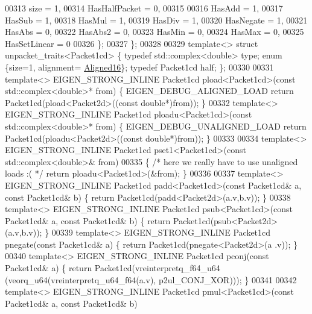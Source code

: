 \begin{DoxyCode}
00313     size = 1,
00314     HasHalfPacket = 0,
00315 
00316     HasAdd    = 1,
00317     HasSub    = 1,
00318     HasMul    = 1,
00319     HasDiv    = 1,
00320     HasNegate = 1,
00321     HasAbs    = 0,
00322     HasAbs2   = 0,
00323     HasMin    = 0,
00324     HasMax    = 0,
00325     HasSetLinear = 0
00326   \};
00327 \};
00328 
00329 \textcolor{keyword}{template}<> \textcolor{keyword}{struct }unpacket\_traits<Packet1cd> \{ \textcolor{keyword}{typedef} std::complex<double> type; \textcolor{keyword}{enum} \{size=1, alignment=
      \hyperlink{group__enums_gga45fe06e29902b7a2773de05ba27b47a1af8e2bf74b04c02199f62c5e3c06dbfcc}{Aligned16}\}; \textcolor{keyword}{typedef} Packet1cd half; \};
00330 
00331 \textcolor{keyword}{template}<> EIGEN\_STRONG\_INLINE Packet1cd pload<Packet1cd>(\textcolor{keyword}{const} std::complex<double>* from) \{ 
      EIGEN\_DEBUG\_ALIGNED\_LOAD \textcolor{keywordflow}{return} Packet1cd(pload<Packet2d>((\textcolor{keyword}{const} \textcolor{keywordtype}{double}*)from)); \}
00332 \textcolor{keyword}{template}<> EIGEN\_STRONG\_INLINE Packet1cd ploadu<Packet1cd>(\textcolor{keyword}{const} std::complex<double>* from) \{ 
      EIGEN\_DEBUG\_UNALIGNED\_LOAD \textcolor{keywordflow}{return} Packet1cd(ploadu<Packet2d>((\textcolor{keyword}{const} \textcolor{keywordtype}{double}*)from)); \}
00333 
00334 \textcolor{keyword}{template}<> EIGEN\_STRONG\_INLINE Packet1cd pset1<Packet1cd>(\textcolor{keyword}{const} std::complex<double>&  from)
00335 \{ \textcolor{comment}{/* here we really have to use unaligned loads :( */} \textcolor{keywordflow}{return} ploadu<Packet1cd>(&from); \}
00336 
00337 \textcolor{keyword}{template}<> EIGEN\_STRONG\_INLINE Packet1cd padd<Packet1cd>(\textcolor{keyword}{const} Packet1cd& a, \textcolor{keyword}{const} Packet1cd& b) \{ \textcolor{keywordflow}{return} 
      Packet1cd(padd<Packet2d>(a.v,b.v)); \}
00338 \textcolor{keyword}{template}<> EIGEN\_STRONG\_INLINE Packet1cd psub<Packet1cd>(\textcolor{keyword}{const} Packet1cd& a, \textcolor{keyword}{const} Packet1cd& b) \{ \textcolor{keywordflow}{return} 
      Packet1cd(psub<Packet2d>(a.v,b.v)); \}
00339 \textcolor{keyword}{template}<> EIGEN\_STRONG\_INLINE Packet1cd pnegate(\textcolor{keyword}{const} Packet1cd& a) \{ \textcolor{keywordflow}{return} Packet1cd(pnegate<Packet2d>(a
      .v)); \}
00340 \textcolor{keyword}{template}<> EIGEN\_STRONG\_INLINE Packet1cd pconj(\textcolor{keyword}{const} Packet1cd& a) \{ \textcolor{keywordflow}{return} Packet1cd(vreinterpretq\_f64\_u64
      (veorq\_u64(vreinterpretq\_u64\_f64(a.v), p2ul\_CONJ\_XOR))); \}
00341 
00342 \textcolor{keyword}{template}<> EIGEN\_STRONG\_INLINE Packet1cd pmul<Packet1cd>(\textcolor{keyword}{const} Packet1cd& a, \textcolor{keyword}{const} Packet1cd& b)

\end{DoxyCode}
